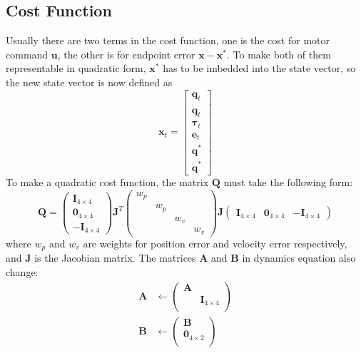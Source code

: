 \subsection{Cost Function}
Usually there are two terms in the cost function, one is the cost for motor command $\bm{u}$, the other is for endpoint error $\bm{x} - \bm{x}^*$. To make both of them representable in quadratic form, $\bm{x}^*$ has to be imbedded into the state vector, so the new state vector is now defined as
\begin{equation}
	\bm{x}_t=\left[ \begin{matrix}\bm{q}_t \\ \dot{\bm{q}}_t \\ \bm{\tau}_t \\ \bm{e}_t \\
	\bm{q}^* \\ \dot{\bm{q}}^*
	\end{matrix} \right]
\end{equation}
To make a quadratic cost function, the matrix $\bm{Q}$ must take the following form:
\begin{equation}
	\bm{Q} = 
	\left( \begin{matrix}
	\bm{I}_{4\times4} \\
	\bm{0}_{4\times4} \\
	\bm{-I}_{4\times4} 
	\end{matrix} \right)
	\bm{J}^T
	\left( \begin{matrix}
	w_p &&&\\
	&w_p&& \\
	&&w_v&\\
	&&&w_v 
	\end{matrix} \right)
	\bm{J}
	\left( \begin{matrix}
	\bm{I}_{4\times4} &
	\bm{0}_{4\times4} &
	\bm{-I}_{4\times4} 
	\end{matrix} \right)
\end{equation}
where $w_p$ and $w_v$ are weights for position error and velocity error respectively, and $\bm{J}$ is the Jacobian matrix. The matrices $\bm{A}$ and $\bm{B}$ in dynamics equation also change:
\begin{equation}
	\begin{split}
	\bm{A} & \leftarrow \left( \begin{matrix}
	\bm{A} \\
	&\bm{I}_{4\times4} \\
	\end{matrix} \right) \\
	\bm{B} & \leftarrow \left( \begin{matrix}
	\bm{B} \\
	\bm{0}_{4\times2} \\
	\end{matrix} \right)
	\end{split}
\end{equation}
